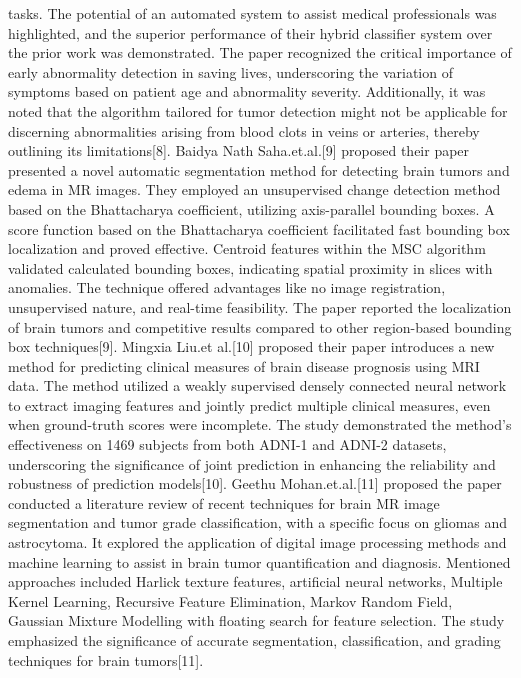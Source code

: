 tasks. The potential of an automated system to assist medical professionals was highlighted, and the superior performance of their hybrid classifier system over the prior work was demonstrated. The paper recognized the critical importance of early abnormality detection in saving lives, underscoring the variation of symptoms based on patient age and abnormality severity. Additionally, it was noted that the algorithm tailored for tumor detection might not be applicable for discerning abnormalities arising from blood clots in veins or arteries, thereby outlining its limitations[8]. Baidya Nath Saha.et.al.[9] proposed their paper presented a novel automatic segmentation method for detecting brain tumors and edema in MR images. They employed an unsupervised change detection method based on the Bhattacharya coefficient, utilizing axis-parallel bounding boxes. A score function based on the Bhattacharya coefficient facilitated fast bounding box localization and proved effective. Centroid features within the MSC algorithm validated calculated bounding boxes, indicating spatial proximity in slices with anomalies. The technique offered advantages like no image registration, unsupervised nature, and real-time feasibility. The paper reported the localization of brain tumors and competitive results compared to other region-based bounding box techniques[9]. Mingxia Liu.et al.[10] proposed their paper introduces a new method for predicting clinical measures of brain disease prognosis using MRI data. The method utilized a weakly supervised densely connected neural network to extract imaging features and jointly predict multiple clinical measures, even when ground-truth scores were incomplete. The study demonstrated the method's effectiveness on 1469 subjects from both ADNI-1 and ADNI-2 datasets, underscoring the significance of joint prediction in enhancing the reliability and robustness of prediction models[10]. Geethu Mohan.et.al.[11] proposed the paper conducted a literature review of recent techniques for brain MR image segmentation and tumor grade classification, with a specific focus on gliomas and astrocytoma. It explored the application of digital image processing methods and machine learning to assist in brain tumor quantification and diagnosis. Mentioned approaches included Harlick texture features, artificial neural networks, Multiple Kernel Learning, Recursive Feature Elimination, Markov Random Field, Gaussian Mixture Modelling with floating search for feature selection. The study emphasized the significance of accurate segmentation, classification, and grading techniques for brain tumors[11].
